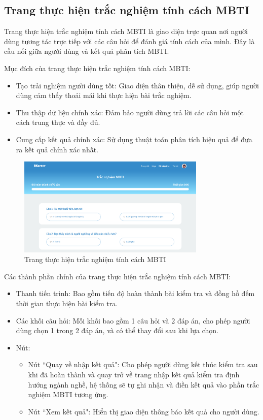 \subsection{Trang thực hiện trắc nghiệm tính cách MBTI}
Trang thực hiện trắc nghiệm tính cách MBTI là giao diện trực quan nơi người dùng tương tác trực tiếp với các câu hỏi để đánh giá tính cách của mình. Đây là cầu nối giữa người dùng và kết quả phân tích MBTI. 

Mục đích của trang thực hiện trắc nghiệm tính cách MBTI:
\begin{itemize}
    \item Tạo trải nghiệm người dùng tốt: Giao diện thân thiện, dễ sử dụng, giúp người dùng cảm thấy thoải mái khi thực hiện bài trắc nghiệm.
    \item Thu thập dữ liệu chính xác: Đảm bảo người dùng trả lời các câu hỏi một cách trung thực và đầy đủ.
    \item Cung cấp kết quả chính xác: Sử dụng thuật toán phân tích hiệu quả để đưa ra kết quả chính xác nhất.
\end{itemize}

\begin{figure}[H]
    \centering
    \includegraphics[width=0.8\textwidth]
    {images/chap5/mbti.png}
    \vspace{0.5cm}
    \caption{Trang thực hiện trắc nghiệm tính cách MBTI}
\end{figure}

Các thành phần chính của trang thực hiện trắc nghiệm tính cách MBTI:
\begin{itemize}
    \item Thanh tiến trình: Bao gồm tiến độ hoàn thành bài kiểm tra và đồng hồ đếm thời gian thực hiện bài kiểm tra.
    \item Các khối câu hỏi: Mỗi khối bao gồm 1 câu hỏi và 2 đáp án, cho phép người dùng chọn 1 trong 2 đáp án, và có thể thay đổi sau khi lựa chọn.
    \item Nút:
        \begin{itemize}
            \item Nút ``Quay về nhập kết quả": Cho phép người dùng kết thúc kiểm tra sau khi đã hoàn thành và quay trở về trang nhập kết quả kiểm tra định hướng ngành nghề, hệ thống sẽ tự ghi nhận và điền kết quả vào phần trắc nghiệm MBTI tương ứng.
            \item Nút ``Xem kết quả": Hiển thị giao diện thông báo kết quả cho người dùng.
        \end{itemize}
\end{itemize}



